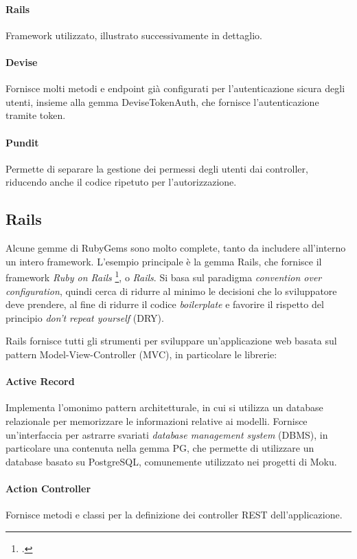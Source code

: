 \paragraph{Rails} Framework utilizzato, illustrato successivamente in dettaglio.
\paragraph{Devise} Fornisce molti metodi e endpoint già configurati per l'autenticazione sicura degli utenti, insieme alla gemma DeviseTokenAuth, che fornisce l'autenticazione tramite token.
\paragraph{Pundit} Permette di separare la gestione dei permessi degli utenti dai controller, riducendo anche il codice ripetuto per l'autorizzazione.

\subsection{Rails}
Alcune gemme di RubyGems sono molto complete, tanto da includere all'interno un intero framework. L'esempio principale è la gemma Rails, che fornisce il framework \emph{Ruby on Rails} \footcite{site:rails}, o \emph{Rails}. Si basa sul paradigma \emph{convention over configuration}, quindi cerca di ridurre al minimo le decisioni che lo sviluppatore deve prendere, al fine di ridurre il codice \emph{boilerplate} e favorire il rispetto del principio \emph{don't repeat yourself} (DRY).

Rails fornisce tutti gli strumenti per sviluppare un'applicazione web basata sul pattern Model-View-Controller (MVC), in particolare le librerie:
\paragraph{Active Record} Implementa l'omonimo pattern architetturale, in cui si utilizza un database relazionale per memorizzare le informazioni relative ai modelli. Fornisce un'interfaccia per astrarre svariati \emph{database management system} (DBMS), in particolare una contenuta nella gemma PG, che permette di utilizzare un database basato su PostgreSQL, comunemente utilizzato nei progetti di Moku.
\paragraph{Action Controller} Fornisce metodi e classi per la definizione dei controller REST dell'applicazione.
